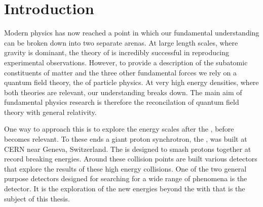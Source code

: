 \chapter{Introduction}
\label{chap:introduction}





Modern physics has now reached a point in which our fundamental
understanding can be broken down into two separate arenas. At large
length scales, where gravity is dominant, the theory of \GR is
incredibly successful in reproducing experimental observations.
However, to provide a description of the subatomic constituents of
matter and the three other fundamental forces we rely on a quantum
field theory, the \SM of particle physics. At very high
energy densities, where both theories are relevant, our understanding
breaks down. The main aim of fundamental physics research is therefore
the reconcilation of quantum field theory with general relativity. 

One way to approach this is to explore the energy scales after the
\SM, before \GR becomes relevant. To these ends a giant proton
synchrotron, the \LHC, was built at CERN near Geneva, Switzerland. The
\LHC is designed to smash protons together at record breaking
energies. Around these collision points are built various detectors
that explore the results of these high energy collisions. One of the
two general purpose detectors designed for searching for a wide range
of phenomena is the \CMS detector.  It is the exploration of the new
energies beyond the \SM with \CMS that is the subject of this thesis.

